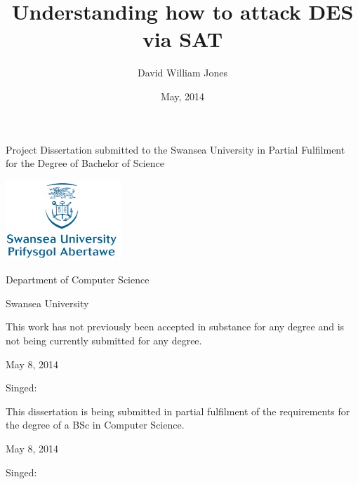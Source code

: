 \documentclass[11pt,a4paper, notitlepage]{report}
\begin{document}
\thispagestyle{empty}
\title{Understanding how to attack DES via SAT}
\author{David William Jones}
\date{May, 2014}
\maketitle
\begin{abstract}
\end{abstract}
\begin{center}
\vspace{3cm}
Project Dissertation submitted to the Swansea University in Partial Fulfilment for the Degree of Bachelor of Science
\end{center}
\begin{center}
\includegraphics{SwanseaUniversityLogo.png}
\end{center}
\begin{center}
Department of Computer Science

Swansea University 
\end{center}
\thispagestyle{empty}




\newpage
\thispagestyle{empty}
 \newline

\noindent This work has not previously been accepted in substance for any degree and is not being currently submitted for any degree. \newline

May 8, 2014 \newline

Singed: \newline
\newline

 \newline

\noindent This dissertation is being submitted in partial fulfilment of the requirements for the degree of a BSc in Computer Science.\newline

May 8, 2014 \newline

Singed: \newline
\newline
\end{document}
